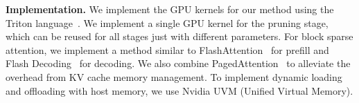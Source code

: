 %


\textbf{Implementation.}
We implement the GPU kernels for our method using the Triton language~\citep{tillet_triton_2019}. We implement a single GPU kernel for the pruning stage, which can be reused for all stages just with different parameters. For block sparse attention, we implement a method similar to FlashAttention~\citep{dao_flashattention_2022} for prefill and Flash Decoding~\citep{dao_flash_decoding} for decoding. We also combine PagedAttention~\citep{kwon_efficient_2023} to alleviate the overhead from KV cache memory management. To implement dynamic loading and offloading with host memory, we use Nvidia UVM (Unified Virtual Memory).
